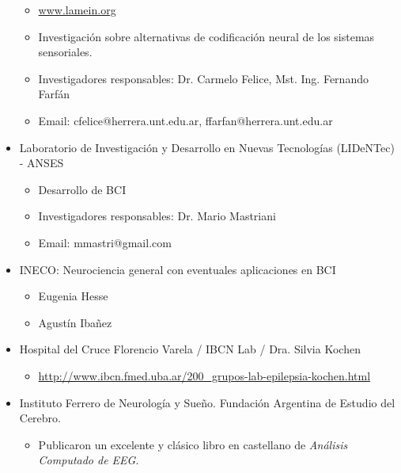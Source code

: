 \begin{itemize}
\begin{itemize}
\item \url{www.lamein.org}
\item Investigación sobre alternativas de codificación neural de los sistemas sensoriales.
\item Investigadores responsables: Dr. Carmelo Felice, Mst. Ing. Fernando Farfán
\item Email: cfelice@herrera.unt.edu.ar, ffarfan@herrera.unt.edu.ar
\end{itemize}
\item Laboratorio de Investigación y Desarrollo en Nuevas Tecnologías (LIDeNTec) - ANSES
\begin{itemize}
\item Desarrollo de BCI
\item Investigadores responsables: Dr. Mario Mastriani
\item Email: mmastri@gmail.com
\end{itemize}
\item INECO: Neurociencia general con eventuales aplicaciones en BCI

\begin{itemize}
\item Eugenia Hesse 
\item Agustín Ibañez
\end{itemize}

\item Hospital del Cruce Florencio Varela / IBCN Lab /  Dra. Silvia Kochen
\begin{itemize}
\item  \url{http://www.ibcn.fmed.uba.ar/200_grupos-lab-epilepsia-kochen.html}
\end{itemize}

\item Instituto Ferrero de Neurología y Sueño. Fundación Argentina de Estudio del Cerebro.
\begin{itemize}
\item Publicaron un excelente y clásico libro en castellano de \textit{Análisis Computado de EEG}.
\end{itemize}

\end{itemize}
